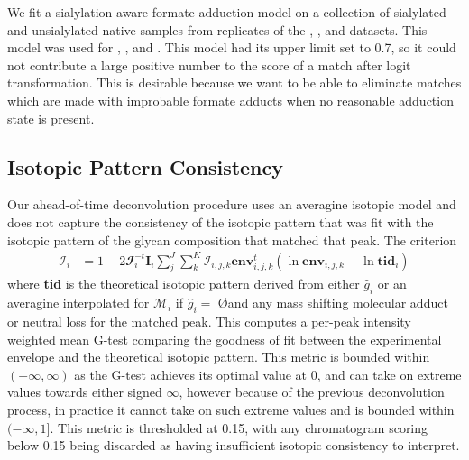         We fit a sialylation-aware formate adduction model on a collection of sialylated and unsialylated
        native \nglycan samples from replicates of the \agp, \igg, and \phil datasets. This model was used
        for \agp, \igg, \phil and \philbs. This model had its upper limit set to 0.7, so it could not contribute
        a large positive number to the score of a match after logit transformation. This is desirable because
        we want to be able to eliminate matches which are made with improbable formate adducts when no
        reasonable adduction state is present.

    \subsection{Isotopic Pattern Consistency}
        Our ahead-of-time deconvolution procedure uses an averagine isotopic model and does not
        capture the consistency of the isotopic pattern that was fit with the isotopic pattern
        of the glycan composition that matched that peak. The criterion
        \begin{align}
            \mathscr{I}_i &= 1 - 2\mathbfcal{I}_i^{-t}\mathbf{I}_i\sum_j^J{
                \sum_k^K{\mathcal{I}_{i, j, k}
                    \textbf{env}_{i, j, k}^t\left(
                        \ln{\textbf{env}}_{i, j, k} -
                        \ln{\textbf{tid}_{i}}
                    \right)
                }
            }
        \end{align}
        where \textbf{tid} is the theoretical isotopic pattern derived from either ${\hat g}_i$
        or an averagine interpolated for $\mathcal{M}_i$ if ${\hat g}_i =$ \O and any mass shifting molecular
        adduct or neutral loss for the matched peak. This computes a per-peak intensity weighted mean
        G-test comparing the goodness of fit between the experimental envelope and the theoretical
        isotopic pattern. This metric is bounded within $(-\infty, \infty)$ as the G-test achieves
        its optimal value at 0, and can take on extreme values towards either signed $\infty$, however
        because of the previous deconvolution process, in practice it cannot take on such extreme
        values and is bounded within $(-\infty, 1]$. This metric is thresholded at 0.15, with any
        chromatogram scoring below 0.15 being discarded as having insufficient isotopic consistency
        to interpret.


